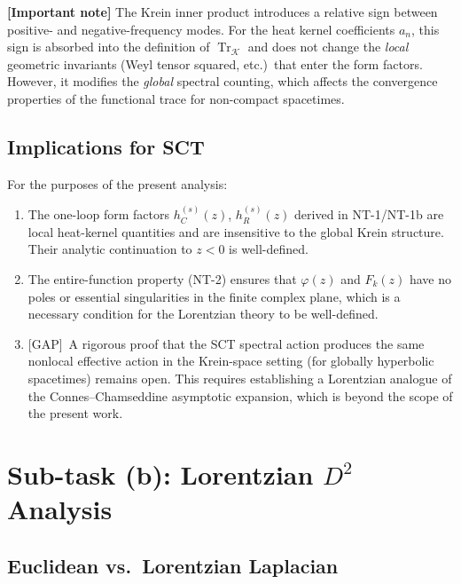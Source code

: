 \documentclass[11pt,a4paper]{article}
\theoremstyle{definition}
\theoremstyle{remark}
\newcommand{\Tr}{\operatorname{Tr}}
\newcommand{\gap}{\textcolor{red!80!black}{\textsf{[GAP]}}}
\newcommand{\signcorrection}[1]{%
  \par\noindent\colorbox{red!10}{%
    \parbox{\dimexpr\linewidth-2\fboxsep}{%
      \textcolor{red!50!black}{\textbf{[Important note]}}
      \textcolor{red!50!black}{#1}%
    }%
  }\par%
}
\begin{document}
\signcorrection{The Krein inner product introduces a relative sign
between positive- and negative-frequency modes.  For the heat kernel
coefficients $a_n$, this sign is absorbed into the definition of
$\Tr_{\mathcal{K}}$ and does not change the \emph{local} geometric
invariants (Weyl tensor squared, etc.)\ that enter the form factors.
However, it modifies the \emph{global} spectral counting, which affects
the convergence properties of the functional trace for non-compact
spacetimes.}

\subsection{Implications for SCT}
\label{sec:krein:implications}

For the purposes of the present analysis:

\begin{enumerate}
  \item The one-loop form factors $h_C^{(s)}(z)$, $h_R^{(s)}(z)$
    derived in NT-1/NT-1b are local heat-kernel quantities and are
    insensitive to the global Krein structure.  Their analytic
    continuation to $z < 0$ is well-defined.
  \item The entire-function property (NT-2) ensures that $\varphi(z)$
    and $F_k(z)$ have no poles or essential singularities in the
    finite complex plane, which is a necessary condition for the
    Lorentzian theory to be well-defined.
  \item \gap\ A rigorous proof that the SCT spectral action produces
    the same nonlocal effective action in the Krein-space setting
    (for globally hyperbolic spacetimes) remains open.  This requires
    establishing a Lorentzian analogue of the Connes--Chamseddine
    asymptotic expansion, which is beyond the scope of the present work.
\end{enumerate}


\section{Sub-task (b): Lorentzian $D^2$ Analysis}
\label{sec:D2}

\subsection{Euclidean vs.\ Lorentzian Laplacian}
\end{document}
